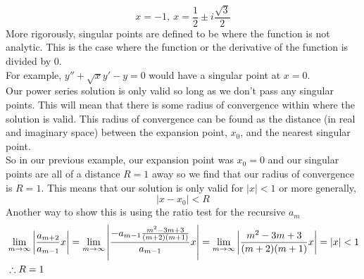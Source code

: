 \documentclass[11pt, fleqn]{article}
\begin{document}
$$x=-1,\ x=\frac{1}{2}\pm i\frac{\sqrt{3}}{2}$$
More rigorously, singular points are defined to be where the function is not analytic. This is the case where the function or the derivative of the function is divided by 0.\\
For example, $y''+\sqrt{x}y'-y=0$ would have a singular point at $x=0$.\\
Our power series solution is only valid so long as we don't pass any singular points. This will mean that there is some radius of convergence within where the solution is valid. This radius of convergence can be found as the distance (in real and imaginary space) between the expansion point, $x_0$, and the nearest singular point.\\
So in our previous example, our expansion point was $x_0=0$ and our singular points are all of a distance $R=1$ away so we find that our radius of convergence is $R=1$. This means that our solution is only valid for $|x|<1$ or more generally,
$$|x-x_0|<R$$
Another way to show this is using the ratio test for the recursive $a_m$
\begin{align*}
    &\lim_{m\to\infty}\left| \frac{a_{m+2}}{a_{m-1}}x \right|=\lim_{m\to\infty}\left| \frac{-a_{m-1}\frac{m^2-3m+3}{(m+2)(m+1)}}{a_{m-1}}x \right|=\lim_{m\to\infty}\left| \frac{m^2-3m+3}{(m+2)(m+1)}x \right|=|x|<1\\
    &\therefore R=1
\end{align*}
\end{document}
